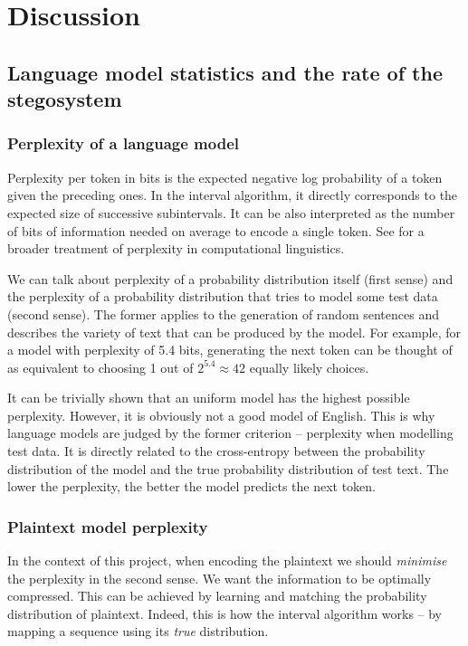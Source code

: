 \documentclass[draft]{IIBproject}
\makeatletter
\DeclareRobustCommand*{\AbbreviationWithDot}[1]{\@ifnextchar{.}{#1}{#1.\@\xspace}}
\DeclareRobustCommand*{\iid}{\AbbreviationWithDot{i.i.d}}
\makeatother
\begin{document}
\renewcommand{\arraystretch}{1}

\cleardoublepage
\section{Discussion}

\subsection{Language model statistics and the rate of the stegosystem}

\subsubsection{Perplexity of a language model}

Perplexity per token in bits is the expected negative log probability of a token given the preceding ones. In the interval algorithm, it directly corresponds to the expected size of successive subintervals. It can be also interpreted as the number of bits of information needed on average to encode a single token. See \cite{brown1992entropy} for a broader treatment of perplexity in computational linguistics.

We can talk about perplexity of a probability distribution itself (first sense) and the perplexity of a probability distribution that tries to model some test data (second sense). The former applies to the generation of random sentences and describes the variety of text that can be produced by the model. For example, for a model with perplexity of 5.4 bits, generating the next token can be thought of as equivalent to choosing 1 out of $2^{5.4} \approx 42$ equally likely choices.

It can be trivially shown that an \iid uniform model has the highest possible perplexity. However, it is obviously not a good model of English. This is why language models are judged by the former criterion -- perplexity when modelling test data. It is directly related to the cross-entropy between the probability distribution of the model and the true probability distribution of test text. The lower the perplexity, the better the model predicts the next token.

\subsubsection{Plaintext model perplexity}

In the context of this project, when encoding the plaintext we should \emph{minimise} the perplexity in the second sense. We want the information to be optimally compressed. This can be achieved by learning and matching the probability distribution of plaintext. Indeed, this is how the interval algorithm works -- by mapping a sequence using its \emph{true} distribution.
\end{document}
